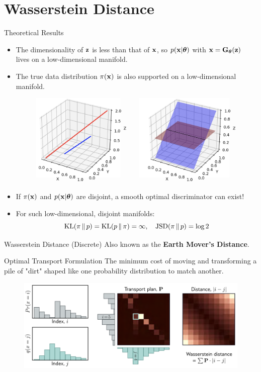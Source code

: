 \documentclass{beamer}
\begin{document}
\section{Wasserstein Distance}
\begin{frame}{Theoretical Results}
	\vspace{-0.3cm}
	\begin{itemize}
		\item The dimensionality of $\mathbf{z}$ is less than that of $\mathbf{x}$, so $p(\mathbf{x} | \boldsymbol{\theta})$ with $\mathbf{x} = \mathbf{G}_{\boldsymbol{\theta}}(\mathbf{z})$ lives on a low-dimensional manifold.
		\item The true data distribution $\pi(\mathbf{x})$ is also supported on a low-dimensional manifold.
		\begin{figure}
			\centering
			\includegraphics[width=0.55\linewidth]{figs/low_dim_manifold}
		\end{figure}
		\item If $\pi(\mathbf{x})$ and $p(\mathbf{x} | \boldsymbol{\theta})$ are disjoint, a smooth optimal discriminator can exist!
		\item For such low-dimensional, disjoint manifolds:
		\vspace{-0.2cm}
		\[
		\mathrm{KL}(\pi\,\|\,p) = \mathrm{KL}(p\,\|\,\pi) = \infty, \quad \mathrm{JSD}(\pi\,\|\,p) = \log 2
		\]
	\end{itemize}
\end{frame}
\begin{frame}{Wasserstein Distance (Discrete)}
	Also known as the \textbf{Earth Mover's Distance}.
	\begin{block}{Optimal Transport Formulation}
		The minimum cost of moving and transforming a pile of "dirt" shaped like one probability distribution to match another.
	\end{block}
	\begin{figure}
		\centering
		\includegraphics[width=\linewidth]{figs/discrete_wasserstein}
	\end{figure}
\end{frame}
\end{document}
